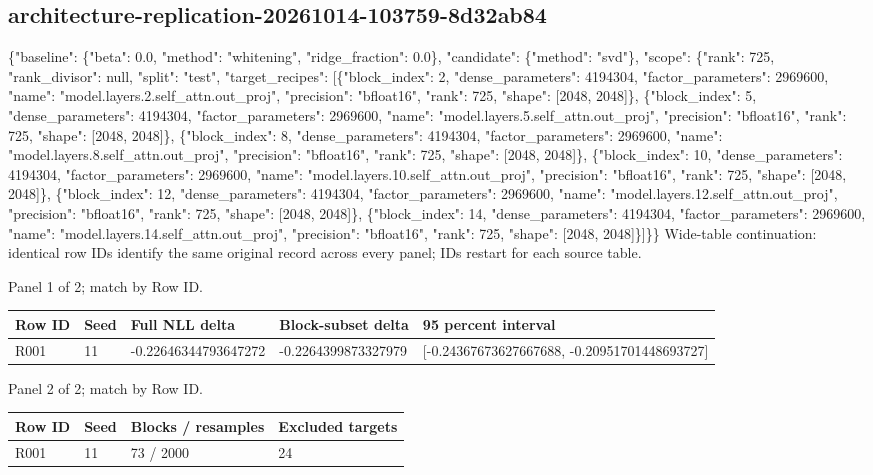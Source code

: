 \documentclass[10pt]{article}
\begin{document}
\subsection{architecture-replication-20261014-103759-8d32ab84}
\{"baseline": \{"beta": 0.0, "method": "whitening", "ridge\_fraction": 0.0\}, "candidate": \{"method": "svd"\}, "scope": \{"rank": 725, "rank\_divisor": null, "split": "test", "target\_recipes": [\{"block\_index": 2, "dense\_parameters": 4194304, "factor\_parameters": 2969600, "name": "model.layers.2.self\_attn.out\_proj", "precision": "bfloat16", "rank": 725, "shape": [2048, 2048]\}, \{"block\_index": 5, "dense\_parameters": 4194304, "factor\_parameters": 2969600, "name": "model.layers.5.self\_attn.out\_proj", "precision": "bfloat16", "rank": 725, "shape": [2048, 2048]\}, \{"block\_index": 8, "dense\_parameters": 4194304, "factor\_parameters": 2969600, "name": "model.layers.8.self\_attn.out\_proj", "precision": "bfloat16", "rank": 725, "shape": [2048, 2048]\}, \{"block\_index": 10, "dense\_parameters": 4194304, "factor\_parameters": 2969600, "name": "model.layers.10.self\_attn.out\_proj", "precision": "bfloat16", "rank": 725, "shape": [2048, 2048]\}, \{"block\_index": 12, "dense\_parameters": 4194304, "factor\_parameters": 2969600, "name": "model.layers.12.self\_attn.out\_proj", "precision": "bfloat16", "rank": 725, "shape": [2048, 2048]\}, \{"block\_index": 14, "dense\_parameters": 4194304, "factor\_parameters": 2969600, "name": "model.layers.14.self\_attn.out\_proj", "precision": "bfloat16", "rank": 725, "shape": [2048, 2048]\}]\}\}
Wide-table continuation: identical row IDs identify the same original record across every panel; IDs restart for each source table.
\par\noindent Panel 1 of 2; match by Row ID.
{\scriptsize\setlength{\tabcolsep}{2pt}
\begin{longtable}{p{}p{}p{}p{}p{}}
Row ID & Seed & Full NLL delta & Block-subset delta & 95 percent interval \\
\hline\endhead
R001 & 11 & -0.22646344793647272 & -0.2264399873327979 & [-0.24367673627667688, -0.20951701448693727] \\
\end{longtable}}
\par\noindent Panel 2 of 2; match by Row ID.
{\scriptsize\setlength{\tabcolsep}{2pt}
\begin{longtable}{p{}p{}p{}p{}}
Row ID & Seed & Blocks / resamples & Excluded targets \\
\hline\endhead
R001 & 11 & 73 / 2000 & 24 \\
\end{longtable}}
\end{document}
